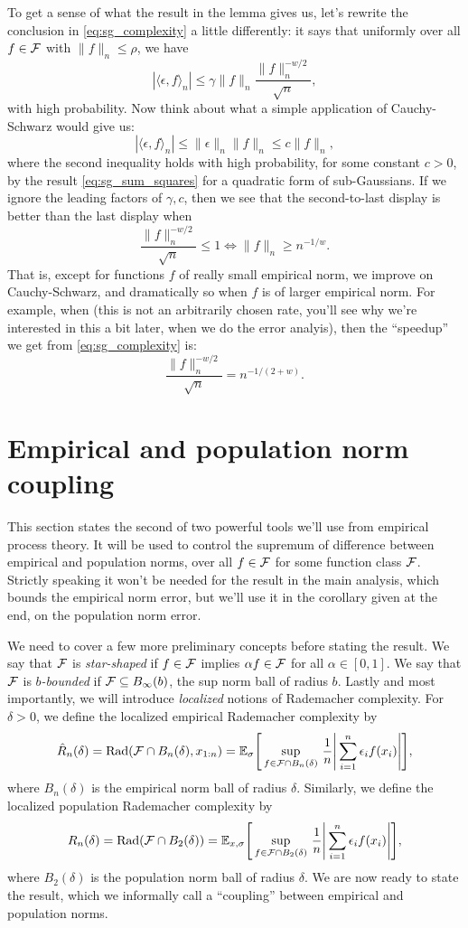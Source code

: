 \documentclass{article}
\begin{document}
To get a sense of what the result in the lemma gives us, let's rewrite the
conclusion in \eqref{eq:sg_complexity} a little differently: it says that
uniformly over all $f \in \mathcal{F}$ with $\|f\|_n \leq \rho$, we have  
\[
|\langle \epsilon, f \rangle_n| \leq \gamma \|f\|_n \frac{\|f\|_n^{-w/2}}
{\sqrt n}, 
\]
with high probability. Now think about what a simple application of
Cauchy-Schwarz would give us: 
\[
|\langle \epsilon, f \rangle_n| \leq \|\epsilon\|_n \|f\|_n \leq c \|f\|_n, 
\]
where the second inequality holds with high probability, for some constant  
$c>0$, by the result \eqref{eq:sg_sum_squares} for a quadratic form of
sub-Gaussians. If we ignore the leading factors of $\gamma, c$, then we see that
the second-to-last display is better than the last display when   
\[
\frac{\|f\|_n^{-w/2}}{\sqrt n} \leq 1 \iff \|f\|_n \geq n^{-1/w}.
\]
That is, except for functions $f$ of really small empirical norm, we improve on
Cauchy-Schwarz, and dramatically so when $f$ is of larger empirical norm. For
example, when  (this is not an arbitrarily
chosen rate, you'll see why we're interested in this a bit later, when we do the
error analyis), then the ``speedup'' we get from \eqref{eq:sg_complexity} is:   
\[
\frac{\|f\|_n^{-w/2}}{\sqrt n} = n^{-1/(2+w)}.
\]

\section{Empirical and population norm coupling}

This section states the second of two powerful tools we'll use from empirical 
process theory. It will be used to control the supremum of difference between
empirical and population norms, over all $f \in \mathcal{F}$ for some function class
$\mathcal{F}$. Strictly speaking it won't be needed for the result in the main analysis,
which bounds the empirical norm error, but we'll use it in the corollary given
at the end, on the population norm error. 

We need to cover a few more preliminary concepts before stating the result. We
say that $\mathcal{F}$ is \emph{star-shaped} if $f \in \mathcal{F}$ implies $\alpha f \in \mathcal{F}$
for all $\alpha \in [0,1]$. We say that $\mathcal{F}$ is \emph{$b$-bounded} if $\mathcal{F}
\subseteq B_\infty(b)$, the sup norm ball of radius $b$. Lastly and most
importantly, we will introduce \emph{localized} notions of Rademacher
complexity. For $\delta>0$, we define the localized empirical Rademacher
complexity by    
\[
\hat{R}_n(\delta) = \mathrm{Rad}(\mathcal{F} \cap B_n(\delta), x_{1:n}) 
= \mathbb{E}_\sigma \Bigg[ \sup_{f \in \mathcal{F} \cap B_n(\delta)} \, \frac{1}{n} \Bigg|  
\sum_{i=1}^n \epsilon_i f(x_i) \Bigg| \Bigg],
\]
where $B_n(\delta)$ is the empirical norm ball of radius $\delta$. Similarly, we
define the localized population Rademacher complexity by   
\[
R_n(\delta) = \mathrm{Rad}(\mathcal{F} \cap B_2(\delta))
= \mathbb{E}_{x,\sigma} \Bigg[ \sup_{f \in \mathcal{F} \cap B_2(\delta)} \, \frac{1}{n} \Bigg|  
\sum_{i=1}^n \epsilon_i f(x_i) \Bigg| \Bigg],
\]
where $B_2(\delta)$ is the population norm ball of radius $\delta$. We are now
ready to state the result, which we informally call a ``coupling'' between
empirical and population norms.
\end{document}
